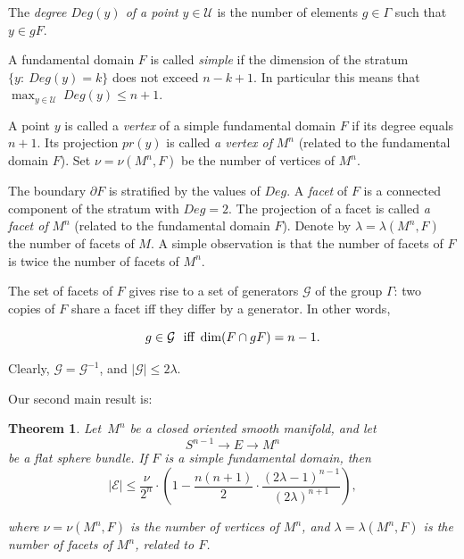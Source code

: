 \documentclass[12pt]{amsart}
\theoremstyle{plain}
\newtheorem{theorem}{Theorem}
\theoremstyle{definition}
\theoremstyle{plain}
\theoremstyle{definition}
\renewcommand{\leq}{\leqslant}
\begin{document}
\medskip




The \textit{degree  $Deg(y)$ of a point} $y\in \mathcal{U}$ is  the number of elements $g \in \Gamma$ such that $y\in gF$.

A fundamental domain $F$ is called \textit{simple}  if  the dimension of the stratum  $\{y: \ Deg(y) = k\}$  does not exceed $n-k+1$. In particular this means that $\max_{y\in \mathcal{U}}~Deg(y)\leq n+1.$

A point $y$ is called a \textit{vertex} of a simple fundamental domain $F$ if its degree equals  $n+1$.
Its projection $pr(y)$ is called \textit{a vertex of} $M^n$ (related to the fundamental domain $F$). 
Set $\nu=\nu(M^n,F)$ be the number of vertices  of $M^n$.


The boundary $\partial F$ is stratified by the values of $Deg$.
A \textit{facet} of $F$ is a  connected component of the stratum with $Deg=2$. The projection of a facet is called\textit{ a facet of} $M^n$  (related to the fundamental domain $F$). Denote by $\lambda =\lambda(M^n,F)$ the number of facets of $M$. 
{A simple observation is that the number of facets of $F$ is  twice the number of facets of $M^n$.}

The set of facets of $F$ gives rise to a set of generators $\mathcal{G}$ of the group $\Gamma$: two copies of $F$ share a facet iff they differ by a generator.
In other words, 

    $$ g \in \mathcal{G}\   \hbox{ iff } \dim(F\cap gF) =n-1.$$



Clearly, $\mathcal{G}=\mathcal{G}^{-1}$, and $|\mathcal{G}|\leq 2\lambda$.  
\medskip

Our second main result is:

\begin{theorem}\label{ThmMainGeneralCase}
Let~$M^n$ be a closed oriented smooth manifold, and let~$$S^{n-1}\rightarrow E\rightarrow M^n$$ be a flat sphere bundle. If $F$ is a simple fundamental domain, then 
$$|\mathcal{E}|\leq  \frac{\nu}{2^n}\cdot  \left( 1 -\dfrac{n(n+1)}{2}\cdot \dfrac{(2\lambda-1)^{n-1}}{(2\lambda)^{n+1}}\right), $$


where $\nu=\nu(M^n,F)$ is the number of vertices of $M^n$, and $\lambda=\lambda(M^n,F)$ is the number of facets of $M^n$, related to $F$. 
\end{theorem}






\end{document}

